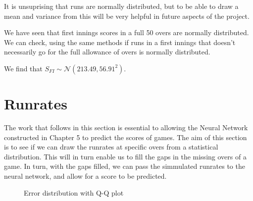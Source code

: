 It is unsuprising that runs are normally distributed, but to be able to draw a mean and variance from this will be very helpful in future aspects of the project.

We have seen that first innings scores in a full 50 overs are normally distributed. We can check, using the same methods if runs in a first innings that 
doesn't necessarily go for the full allowance of overs is normally distributed. 

We find that $S_{FI} \sim \mathcal{N}(213.49,56.91^2)$. 

\section{Runrates}
\label{exprr}
The work that follows in this section is essential to allowing the Neural Network constructed in Chapter 5 to predict the scores of games. The aim of this section is 
to see if we can draw the runrates at specific overs from a statistical distribution. This will in turn enable us to fill the gaps in the missing overs of a game. In turn, 
with the gaps filled, we can pass the simmulated runrates to the neural network, and allow for a score to be predicted. 

\begin{figure}[h]
    \centering
    \qquad
    \caption{Error distribution with Q-Q plot}
    \label{MeanAndSDRR}
\end{figure}

